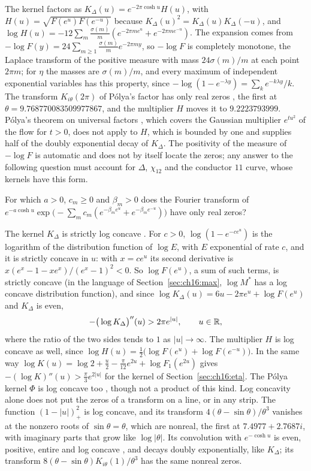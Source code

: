 The kernel factors as $K_\Delta(u)=e^{-2\pi\cosh u}H(u)$, with $H(u)=\sqrt{F(e^u)F(e^{-u})}$ because $K_\Delta(u)^2=K_\Delta(u)K_\Delta(-u)$, and $\log H(u)=-12\sum_m\frac{\sigma(m)}m(e^{-2\pi me^u}+e^{-2\pi me^{-u}})$. The expansion comes from $-\log F(y)=24\sum_{m\ge1}\frac{\sigma(m)}me^{-2\pi my}$, so $-\log F$ is completely monotone, the Laplace transform of the positive measure with mass $24\sigma(m)/m$ at each point $2\pi m$; for $\eta$ the masses are $\sigma(m)/m$, and every maximum of independent exponential variables has this property, since $-\log(1-e^{-\lambda y})=\sum_ke^{-k\lambda y}/k$. The transform $K_{i\theta}(2\pi)$ of P\'olya's factor has only real zeros \cite{Polya}, the first at $\theta=9.768770083509977867$, and the multiplier $H$ moves it to $9.2223793999$. P\'olya's theorem on universal factors \cite[p.~197]{deBruijn}, which covers the Gaussian multiplier $e^{tu^2}$ of the flow for $t>0$, does not apply to $H$, which is bounded by one and supplies half of the doubly exponential decay of $K_\Delta$. The positivity of the measure of $-\log F$ is automatic and does not by itself locate the zeros; any answer to the following question must account for $\Delta$, $\chi_{12}$ and the conductor $11$ curve, whose kernels have this form.

\begin{question}\label{q:maxexp:mult}
For which $a>0$, $c_m\ge0$ and $\beta_m>0$ does the Fourier transform of $e^{-a\cosh u}\exp\big(-\sum_mc_m(e^{-\beta_me^u}+e^{-\beta_me^{-u}})\big)$ have only real zeros?
\end{question}

The kernel $K_\Delta$ is strictly log concave \cite{P26thor}. For $c>0$, $\log(1-e^{-ce^u})$ is the logarithm of the distribution function of $\log E$, with $E$ exponential of rate $c$, and it is strictly concave in $u$: with $x=ce^u$ its second derivative is $x(e^x-1-xe^x)/(e^x-1)^2<0$. So $\log F(e^u)$, a sum of such terms, is strictly concave (in the language of Section~\ref{sec:ch16:max}, $\log M^*$ has a log concave distribution function), and since $\log K_\Delta(u)=6u-2\pi e^u+\log F(e^u)$ and $K_\Delta$ is even,
\[
-\big(\log K_\Delta\big)''(u)>2\pi e^{|u|},\qquad u\in\mathbb{R},
\]
where the ratio of the two sides tends to $1$ as $|u|\to\infty$. The multiplier $H$ is log concave as well, since $\log H(u)=\frac12\big(\log F(e^u)+\log F(e^{-u})\big)$. In the same way $\log K(u)=\log2+\frac u2-\frac\pi{12}e^{2u}+\log F_1(e^{2u})$ gives $-(\log K)''(u)>\frac\pi3e^{2|u|}$ for the kernel of Section~\ref{sec:ch16:eta}. The P\'olya kernel $\Phi$ is log concave too \cite{CC13}, though not a product of this kind. Log concavity alone does not put the zeros of a transform on a line, or in any strip. The function $(1-|u|)_+^2$ is log concave, and its transform $4(\theta-\sin\theta)/\theta^3$ vanishes at the nonzero roots of $\sin\theta=\theta$, which are nonreal, the first at $7.4977+2.7687i$, with imaginary parts that grow like $\log|\theta|$. Its convolution with $e^{-\cosh u}$ is even, positive, entire and log concave \cite{SW14}, and decays doubly exponentially, like $K_\Delta$; its transform $8(\theta-\sin\theta)K_{i\theta}(1)/\theta^3$ has the same nonreal zeros.

